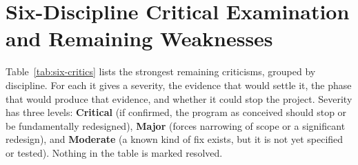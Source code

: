 \documentclass[10pt,twoside,openany]{book}
\theoremstyle{dpepstyle}
\begin{document}
\chapter{Six-Discipline Critical Examination and Remaining Weaknesses}
\label{ch:critique}

Table~\ref{tab:six-critics} lists the strongest remaining criticisms, grouped by discipline. For each it gives a severity, the evidence that would settle it, the phase that would produce that evidence, and whether it could stop the project. Severity has three levels: \textbf{Critical} (if confirmed, the program as conceived should stop or be fundamentally redesigned), \textbf{Major} (forces narrowing of scope or a significant redesign), and \textbf{Moderate} (a known kind of fix exists, but it is not yet specified or tested). Nothing in the table is marked resolved.
\end{document}
